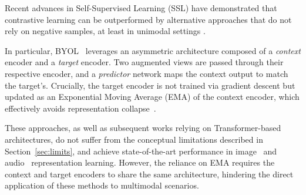 \documentclass{article}
\newcommand{\alain}[1]{\textcolor{magenta}{#1}}
\newcommand{\comm}[1]{\textcolor{red}{TODO #1}}
\begin{document}
Recent advances in Self-Supervised Learning (SSL) have demonstrated that contrastive learning can be outperformed by alternative approaches that do not rely on negative samples, at least in unimodal settings \cite{chen2021exploring,grill2020bootstrap,assranSelfSupervisedLearningImages2023}.

In particular, BYOL~\cite{grill2020bootstrap} leverages an asymmetric architecture composed of a \emph{context} encoder and a \emph{target} encoder. Two augmented views are passed through their respective encoder, and a \emph{predictor} network maps the context output to match the target's. Crucially, the target encoder is not trained via gradient descent but updated as an Exponential Moving Average (EMA) of the context encoder, which effectively avoids representation collapse~\cite{Tian2021}.



These approaches, as well as
subsequent works
relying on Transformer-based architectures, do not suffer from the conceptual limitations described in Section~\ref{sec:limits}, and achieve state-of-the-art performance in image~\cite{DINOv2,assranSelfSupervisedLearningImages2023,baevskiData2vecGeneralFramework2022} and audio~\cite{niizumi2021byol,ATST,niizumiMaskedModelingDuo2023,MATPAC} representation learning.
However, the reliance on EMA requires the context and target encoders to share the same architecture, hindering the direct application of these methods to multimodal scenarios.
\end{document}

